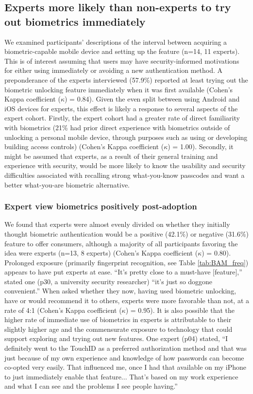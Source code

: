 \subsection{Experts more likely than non-experts to try out biometrics immediately} 
We examined participants' descriptions of the interval between acquiring a
biometric-capable mobile device and setting up the feature (n=14, 11
experts). This is of interest assuming that users may have security-informed
motivations for either using immediately or avoiding a new authentication
method. A preponderance of the experts interviewed (57.9\%) reported at least
trying out the biometric unlocking feature immediately when it was first
available (Cohen's Kappa coefficient (\(\kappa\)) = 0.84). Given the even split
between using Android and iOS devices for experts, this effect is likely a response to 
several aspects of the expert cohort. Firstly, the expert cohort had a greater rate of
direct familiarity with biometrics (21\% had prior direct experience with
biometrics outside of unlocking a personal mobile device, through purposes such
as using or developing building access controls) (Cohen's Kappa coefficient
(\(\kappa\)) = 1.00). Secondly, it might be assumed that experts, as a result of
their general training and experience with security, would be more likely to
know the usability and security difficulties associated with recalling strong
what-you-know passcodes and want a better what-you-are biometric
alternative.

\subsubsection{Expert view biometrics positively post-adoption}
We found that experts were almost evenly divided on whether they initially
thought biometric authentication would be a positive (42.1\%) or negative
(31.6\%) feature to offer consumers, although a majority of all participants
favoring the idea were experts (n=13, 8 experts) (Cohen's Kappa coefficient
(\(\kappa\)) = 0.80). Prolonged exposure  (primarily
fingerprint recognition, see Table \ref{tab:BAM_freq}) appears to have put
experts at ease. ``It's pretty close to a must-have [feature],'' stated one
(p30, a university security researcher) ``it's just so doggone convenient.''
When asked whether they now, having used biometric unlocking, have or would
recommend it to others, experts were more favorable than not, at a rate of 4:1
(Cohen's Kappa coefficient (\(\kappa\)) = 0.95). It is also possible that the
higher rate of immediate use of biometrics in experts is attributable to their
slightly higher age and the commensurate exposure to technology that could
support exploring and trying out new features. One expert (p04) stated, ``I
definitely went to the TouchID as a preferred authorization method and that was
just because of my own experience and knowledge of how passwords can become
co-opted very easily. That influenced me, once I had that available on my iPhone
to just immediately enable that feature... That's based on my work experience
and what I can see and the problems I see people having.''

